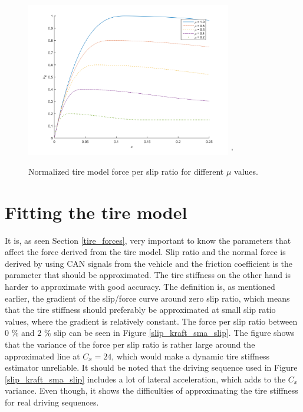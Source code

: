 \begin{figure}[h]
	\centering
	\includegraphics[width=0.8\textwidth]{Pictures/slipkraft_olika_mue}
	'\caption {Normalized tire model force per slip ratio for different $ \mu $ values.}
	\label{different_mue}
\end{figure}

\section{Fitting the tire model}
It is, as seen Section \ref{tire_forces}, very important to know the parameters that affect the force derived from the tire model. Slip ratio and the normal force is derived by using CAN signals from the vehicle and the friction coefficient is the parameter that should be approximated. The tire stiffness on the other hand is harder to approximate with good accuracy. The definition is, as mentioned earlier, the gradient of the slip/force curve around zero slip ratio, which means that the tire stiffness should preferably be approximated at small slip ratio values, where the gradient is relatively constant. The force per slip ratio between $ 0 $ \% and $ 2 $ \% slip can be seen in Figure \ref{slip_kraft_sma_slip}. The figure shows that the variance of the force per slip ratio is rather large around the approximated line at $ C_{x} = 24 $, which would make a dynamic tire stiffness estimator unreliable. It should be noted that the driving sequence used in Figure \ref{slip_kraft_sma_slip} includes a lot of lateral acceleration, which adds to the $ C_{x} $ variance. Even though, it shows the difficulties of approximating the tire stiffness for real driving sequences. 

